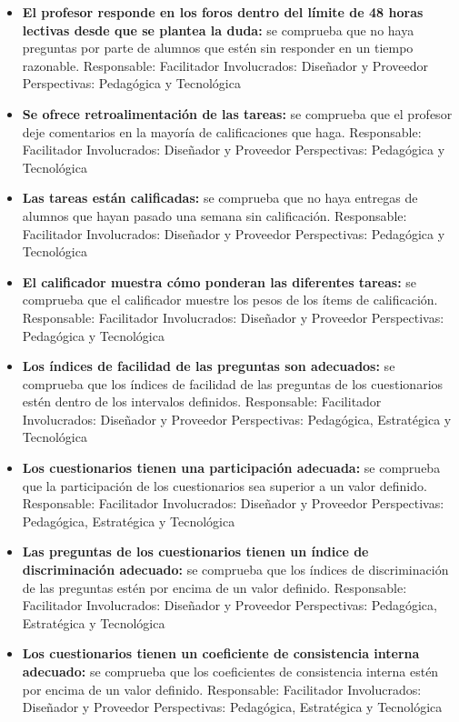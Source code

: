     \begin{itemize}
    	\item
    	\textbf{El profesor responde en los foros dentro del límite de 48
    		horas lectivas desde que se plantea la duda:} se comprueba que no
    	haya preguntas por parte de alumnos que estén sin responder en un
    	tiempo razonable. {Responsable:} Facilitador
    	{Involucrados:} Diseñador y Proveedor {Perspectivas:}
    	Pedagógica y Tecnológica
    	\item
    	\textbf{Se ofrece retroalimentación de las tareas:} se comprueba que
    	el profesor deje comentarios en la mayoría de calificaciones que haga.
    	{Responsable:} Facilitador {Involucrados:} Diseñador y
    	Proveedor {Perspectivas:} Pedagógica y Tecnológica
    	\item
    	\textbf{Las tareas están calificadas:} se comprueba que no haya
    	entregas de alumnos que hayan pasado una semana sin calificación.
    	{Responsable:} Facilitador {Involucrados:} Diseñador y
    	Proveedor {Perspectivas:} Pedagógica y Tecnológica
    	\item
    	\textbf{El calificador muestra cómo ponderan las diferentes tareas:}
    	se comprueba que el calificador muestre los pesos de los ítems de
    	calificación. {Responsable:} Facilitador {Involucrados:}
    	Diseñador y Proveedor {Perspectivas:} Pedagógica y Tecnológica
        \item
        \textbf{Los índices de facilidad de las preguntas son adecuados:} se comprueba que los índices de facilidad de las preguntas de los cuestionarios estén dentro de los intervalos definidos.  {Responsable:} Facilitador {Involucrados:} Diseñador y Proveedor {Perspectivas:} Pedagógica, Estratégica y Tecnológica
        \item
        \textbf{Los cuestionarios tienen una participación adecuada:} se comprueba que la participación de los cuestionarios sea superior a un valor definido. {Responsable:} Facilitador {Involucrados:} Diseñador y Proveedor {Perspectivas:} Pedagógica, Estratégica y Tecnológica
        \item
        \textbf{Las preguntas de los cuestionarios tienen un índice de discriminación adecuado:} se comprueba que los índices de discriminación de las preguntas estén por encima de un valor definido. {Responsable:} Facilitador {Involucrados:} Diseñador y Proveedor {Perspectivas:} Pedagógica, Estratégica y Tecnológica  
        \item
        \textbf{Los cuestionarios tienen un coeficiente de consistencia interna adecuado:} se comprueba que los coeficientes de consistencia interna estén por encima de un valor definido. {Responsable:} Facilitador {Involucrados:} Diseñador y Proveedor {Perspectivas:} Pedagógica, Estratégica y Tecnológica  
    \end{itemize}
    
